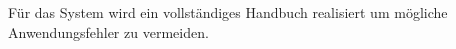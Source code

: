 \documentclass[../../Pflichtenheft.tex]{subfiles}
\begin{document}
    Für das System wird ein vollständiges Handbuch realisiert um mögliche Anwendungsfehler zu vermeiden.
\end{document}

